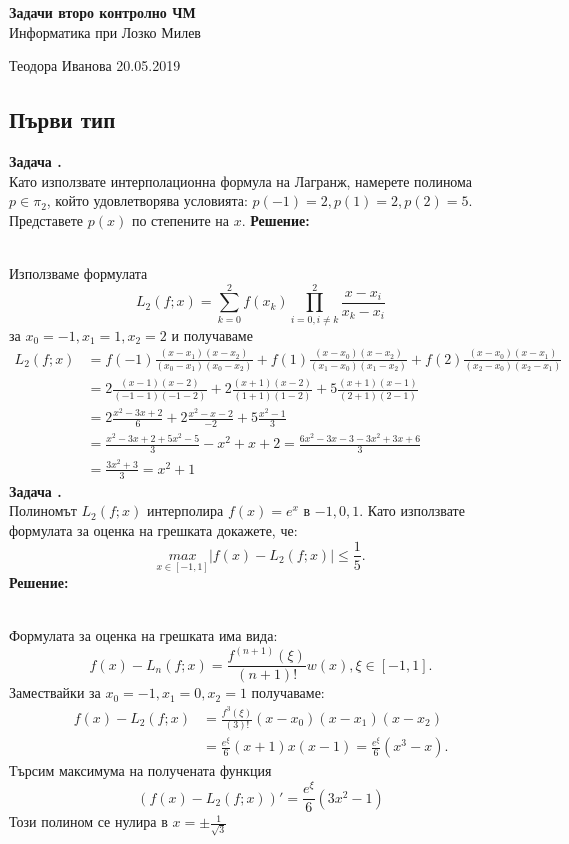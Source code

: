\documentclass[12pt]{article}
\newcounter{problem}
\newcounter{solution}
\newcommand\problem{%
  \stepcounter{problem}%
  \textbf{Задача \theproblem.}~%
  \\
}
\newcommand\solution{%
  \textbf{Решение:}\\~%
}
\begin{document}
\begin{titlepage}
\begin{center}
    \vspace{5em}
    \textbf{\Huge{Задачи второ контролно ЧМ}}\\
    \vspace{2em}
    \LARGE{Информатика при Лозко Милев}
\end{center}
\vfill

Теодора Иванова \hfill 20.05.2019
\end{titlepage}
\begin{center}{\section*{Първи тип}}\end{center}
\problem
Като използвате интерполационна формула на Лагранж, намерете полинома $p\in\pi_2$, който удовлетворява условията: $p(-1) = 2, p(1)  = 2, p(2) = 5$. Представете $p(x)$ по степените на $x$.
\solution
Използваме формулата
\begin{equation*}
L_2(f;x) = \sum_{k=0}^{2}f(x_k)\prod_{i=0,i\neq k}^{2}\frac{x-x_i}{x_k-x_i}
\end{equation*}
за $x_0=-1, x_1 = 1, x_2 = 2$
и получаваме
\begin{align*}
L_2(f;x) &= f(-1)\frac{(x-x_1)(x-x_2)}{(x_0-x_1)(x_0-x_2)}+f(1)\frac{(x-x_0)(x-x_2)}{(x_1-x_0)(x_1-x_2)}+f(2)\frac{(x-x_0)(x-x_1)}{(x_2-x_0)(x_2-x_1)}\\
&=2\frac{(x-1)(x-2)}{(-1-1)(-1-2)}+2\frac{(x+1)(x-2)}{(1+1)(1-2)}+5\frac{(x+1)(x-1)}{(2+1)(2-1)}\\
&=2\frac{x^2-3x+2}{6}+2\frac{x^2-x-2}{-2}+5\frac{x^2-1}{3}\\
&=\frac{x^2-3x+2+5x^2-5}{3} - x^2+x+2 = \frac{6x^2-3x-3-3x^2+3x+6}{3}\\
&=\frac{3x^2+3}{3} = \boxed{x^2+1}
\end{align*}
\problem
Полиномът $L_2(f;x)$ интерполира $f(x)= e^x$ в $-1, 0, 1$. Като използвате формулата за оценка на грешката докажете, че:
\begin{equation*}
\underset{x\in[-1,1]}{max}|f(x)-L_2(f;x)|\leq \frac{1}{5}.
\end{equation*}
\solution
Формулата за оценка на грешката има вида:
\begin{equation*}
f(x)-L_n(f;x) = \frac{f^{(n+1)}(\xi)}{(n+1)!}w(x), \xi\in[-1,1].
\end{equation*}
Замествайки за $x_0=-1, x_1 = 0, x_2 = 1$ получаваме:
\begin{align*}
f(x)-L_2(f;x) &= \frac{f^{3}(\xi)}{(3)!}(x-x_0)(x-x_1)(x-x_2) \\
&=\frac{e^\xi}{6}(x+1)x(x-1) = \boxed{\frac{e^\xi}{6}(x^3-x).}
\end{align*}
Търсим максимума на получената функция
\begin{equation*}
(f(x)-L_2(f;x))'=\frac{e^\xi}{6}(3x^2-1)
\end{equation*}
Този полином се нулира в $x=\pm\frac{1}{\sqrt{3}}$
\end{document}
